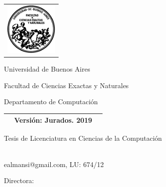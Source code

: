 \newcommand{\HRule}{\rule{\linewidth}{0.2mm}}
%
\thispagestyle{empty}

\begin{center}\leavevmode

\vspace{-2cm}

\begin{tabular}{l}
\includegraphics[width=2.6cm]{logofcen.pdf}
\end{tabular}


{\large \sc Universidad de Buenos Aires

Facultad de Ciencias Exactas y Naturales

Departamento de Computaci\'on}

\vspace{3.0cm}

{
\Large
\begin{tabular}{|p{2cm}cp{2cm}|}
\hline
& Versión: Jurados. 2019 &\\
\hline
\end{tabular}
}

\vspace{2.0cm}

\begin{huge}
\textbf{\tituloTesis}
\end{huge}

\vspace{2cm}

{\large Tesis de Licenciatura en Ciencias de la Computaci\'on}

\vspace{1cm}

{
  \Large \autor \\
  \small ealmansi@gmail.com, LU: 674/12
}

\end{center}

\vfill

{\large

{Directora: \director}

\vspace{.2cm}

\lugar
}

\newpage\thispagestyle{empty}
